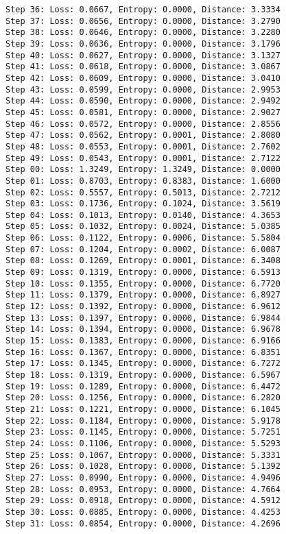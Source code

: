 \documentclass[11pt]{article}
\begin{document}
\begin{Verbatim}[commandchars=\\\{\}]
Step 36: Loss: 0.0667, Entropy: 0.0000, Distance: 3.3334
Step 37: Loss: 0.0656, Entropy: 0.0000, Distance: 3.2790
Step 38: Loss: 0.0646, Entropy: 0.0000, Distance: 3.2280
Step 39: Loss: 0.0636, Entropy: 0.0000, Distance: 3.1796
Step 40: Loss: 0.0627, Entropy: 0.0000, Distance: 3.1327
Step 41: Loss: 0.0618, Entropy: 0.0000, Distance: 3.0867
Step 42: Loss: 0.0609, Entropy: 0.0000, Distance: 3.0410
Step 43: Loss: 0.0599, Entropy: 0.0000, Distance: 2.9953
Step 44: Loss: 0.0590, Entropy: 0.0000, Distance: 2.9492
Step 45: Loss: 0.0581, Entropy: 0.0000, Distance: 2.9027
Step 46: Loss: 0.0572, Entropy: 0.0000, Distance: 2.8556
Step 47: Loss: 0.0562, Entropy: 0.0001, Distance: 2.8080
Step 48: Loss: 0.0553, Entropy: 0.0001, Distance: 2.7602
Step 49: Loss: 0.0543, Entropy: 0.0001, Distance: 2.7122
Step 00: Loss: 1.3249, Entropy: 1.3249, Distance: 0.0000
Step 01: Loss: 0.8703, Entropy: 0.8383, Distance: 1.6000
Step 02: Loss: 0.5557, Entropy: 0.5013, Distance: 2.7212
Step 03: Loss: 0.1736, Entropy: 0.1024, Distance: 3.5619
Step 04: Loss: 0.1013, Entropy: 0.0140, Distance: 4.3653
Step 05: Loss: 0.1032, Entropy: 0.0024, Distance: 5.0385
Step 06: Loss: 0.1122, Entropy: 0.0006, Distance: 5.5804
Step 07: Loss: 0.1204, Entropy: 0.0002, Distance: 6.0087
Step 08: Loss: 0.1269, Entropy: 0.0001, Distance: 6.3408
Step 09: Loss: 0.1319, Entropy: 0.0000, Distance: 6.5913
Step 10: Loss: 0.1355, Entropy: 0.0000, Distance: 6.7720
Step 11: Loss: 0.1379, Entropy: 0.0000, Distance: 6.8927
Step 12: Loss: 0.1392, Entropy: 0.0000, Distance: 6.9612
Step 13: Loss: 0.1397, Entropy: 0.0000, Distance: 6.9844
Step 14: Loss: 0.1394, Entropy: 0.0000, Distance: 6.9678
Step 15: Loss: 0.1383, Entropy: 0.0000, Distance: 6.9166
Step 16: Loss: 0.1367, Entropy: 0.0000, Distance: 6.8351
Step 17: Loss: 0.1345, Entropy: 0.0000, Distance: 6.7272
Step 18: Loss: 0.1319, Entropy: 0.0000, Distance: 6.5967
Step 19: Loss: 0.1289, Entropy: 0.0000, Distance: 6.4472
Step 20: Loss: 0.1256, Entropy: 0.0000, Distance: 6.2820
Step 21: Loss: 0.1221, Entropy: 0.0000, Distance: 6.1045
Step 22: Loss: 0.1184, Entropy: 0.0000, Distance: 5.9178
Step 23: Loss: 0.1145, Entropy: 0.0000, Distance: 5.7251
Step 24: Loss: 0.1106, Entropy: 0.0000, Distance: 5.5293
Step 25: Loss: 0.1067, Entropy: 0.0000, Distance: 5.3331
Step 26: Loss: 0.1028, Entropy: 0.0000, Distance: 5.1392
Step 27: Loss: 0.0990, Entropy: 0.0000, Distance: 4.9496
Step 28: Loss: 0.0953, Entropy: 0.0000, Distance: 4.7664
Step 29: Loss: 0.0918, Entropy: 0.0000, Distance: 4.5912
Step 30: Loss: 0.0885, Entropy: 0.0000, Distance: 4.4253
Step 31: Loss: 0.0854, Entropy: 0.0000, Distance: 4.2696

\end{Verbatim}
\end{document}
